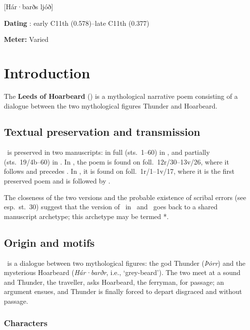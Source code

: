 [Hár·barðs ljóð]

\begin{flushright}%
\textbf{Dating} \parencite{Sapp2022}: early C11th (0.578)--late C11th (0.377)

\textbf{Meter:} Varied%
\end{flushright}

\section{Introduction}

The \textbf{Leeds of Hoarbeard} () is a mythological narrative poem consisting of a dialogue between the two mythological figures Thunder and Hoarbeard.

\subsection{Textual preservation and transmission}

\Harbardsljod\ is preserved in two manuscripts: in full (sts.~1--60) in \Regius, and partially (sts.~19/4b--60) in \AM.  In \Regius, the poem is found on foll.~12r/30--13v/26, where it follows  and precedes .  In \AM, it is found on foll.~1r/1--1v/17, where it is the first preserved poem and is followed by .

The closeness of the two versions and the probable existence of scribal errors (see esp.~st.~30) suggest that the version of \Harbardsljod\ in \Regius\ and \AM\ goes back to a shared manuscript archetype; this archetype may be termed *\Regius\AM.

\subsection{Origin and motifs}

\Harbardsljod\ is a dialogue between two mythological figures: the god Thunder (\emph{Þȯrr}) and the mysterious Hoarbeard (\emph{Hár·barðr}, i.e., ‘grey-beard’).  The two meet at a sound and Thunder, the traveller, asks Hoarbeard, the ferryman, for passage; an argument ensues, and Thunder is finally forced to depart disgraced and without passage.

\subsubsection{Characters}

